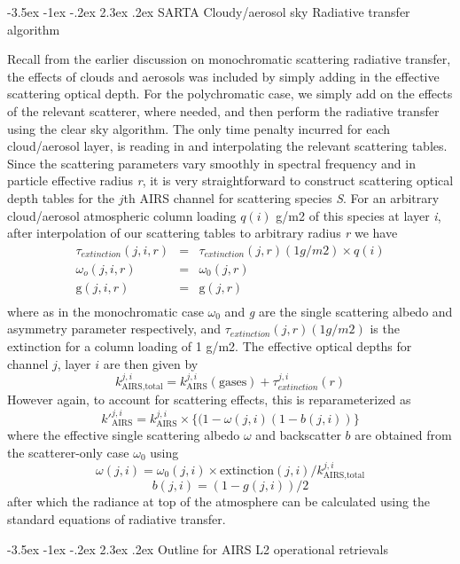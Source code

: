 \documentclass[11pt]{article}
\makeatletter
\renewcommand{\section}{\@startsection {section}{1}{\z@}%
                                   {-3.5ex \@plus -1ex \@minus -.2ex}%
                                   {2.3ex \@plus.2ex}%
                                   {\reset@font\large\bfseries}}
\makeatother
\begin{document}
\section{SARTA Cloudy/aerosol sky Radiative transfer algorithm}

Recall from the earlier discussion on monochromatic scattering
radiative transfer, the effects of clouds and aerosols was included by
simply adding in the effective scattering optical depth. For the
polychromatic case, we simply add on the effects of the relevant
scatterer, where needed, and then perform the radiative transfer using
the clear sky algorithm. The only time penalty incurred for each
cloud/aerosol layer, is reading in and interpolating the relevant
scattering tables. Since the scattering parameters vary smoothly in
spectral frequency and in particle effective radius {\em r}, 
it is very straightforward to construct scattering
optical depth tables for the $j$th AIRS channel for scattering species
{\em S}. For an arbitrary cloud/aerosol atmospheric column loading $q(i)$ g/m2 of
this species at layer {\em i}, after interpolation of our scattering tables to arbitrary radius {\em r} we have
\begin{eqnarray*}
  \tau_{extinction}(j,i,r) & = &  \tau_{extinction}(j,r)(1 g/m2) \times  q(i) \\
  \omega_o(j,i,r) & = &  \omega_{0}(j,r) \\
  \text{g}(j,i,r) & = &  \text{g}(j,r) \\
\end{eqnarray*}
where as in the monochromatic case $\omega_0$ and {\em g} are the single scattering 
albedo and asymmetry parameter respectively, and $\tau_{extinction}(j,r)(1 g/m2)$ is the
extinction for a column loading of 1 g/m2.
The effective optical depths for channel $j$, layer $i$ are then given by
\[
k_{\text{AIRS,total}}^{j,i} = k_{\text{AIRS}}^{j,i}(\text{gases}) +
\tau_{extinction}^{j,i}(r)
\]
However again, to account for scattering effects, this is
reparameterized as
\[
k\prime_{\text{AIRS}}^{j,i} = k_{\text{AIRS}}^{j,i} \times \{
(1-\omega(j,i) (1-b(j,i)) \}
\]
where the effective single scattering albedo $\omega$ and backscatter
$b$ are obtained from the scatterer-only case $\omega_{0}$ using
\[
\omega(j,i) = \omega_{0}(j,i) \times
\text{extinction}(j,i)/k_{\text{AIRS,total}}^{j,i}
\]
\[
b(j,i) = (1 - g(j,i))/2
\]
after which the radiance at top of the atmosphere can be calculated
using the standard equations of radiative transfer.

\section{Outline for AIRS L2 operational retrievals}
\end{document}
